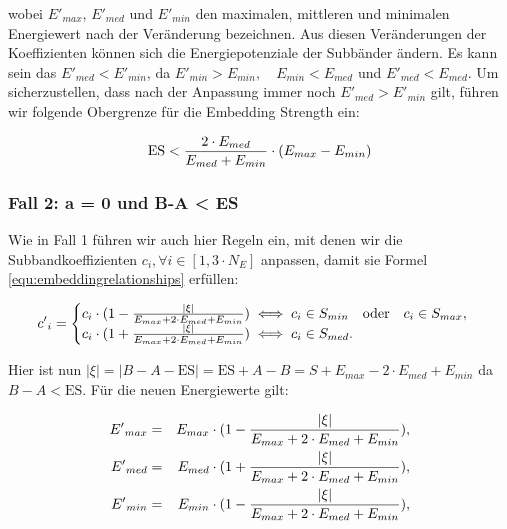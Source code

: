 wobei ${E'}_{max}$, ${E'}_{med}$ und ${E'}_{min}$ den maximalen, mittleren und minimalen Energiewert nach der Veränderung bezeichnen. Aus diesen Veränderungen der Koeffizienten können sich die Energiepotenziale der Subbänder ändern. Es kann sein das ${E'}_{med} < {E'}_{min}$, da ${E'}_{min}>{E}_{min},\quad {E}_{min}<{E}_{med}$ und ${E'}_{med}<{E}_{med}$. Um sicherzustellen, dass nach der Anpassung immer noch ${E'}_{med} > {E'}_{min}$ gilt, führen wir folgende Obergrenze für die Embedding Strength ein:

	\begin{equation}
		\mbox{ES} < { 2 \cdot {E}_{med} \over {E}_{med} + {E}_{min} } \cdot ( {E}_{max} - {E}_{min} )
		\label{equ:embeddingstrengthconstraint_case1}
	\end{equation}

\subsubsection{Fall 2: a = 0 und B-A < ES}

Wie in Fall 1 führen wir auch hier Regeln ein, mit denen wir die Subbandkoeffizienten ${c}_{i}, \forall i \in [1, 3\cdot{N}_{E}]$ anpassen, damit sie Formel \ref{equ:embeddingrelationships} erfüllen:

	 \begin{equation}
		 {c'}_{i} = \begin{cases}
    	 				{c}_{i} \cdot ( 1 - { |\xi| \over {{E}_{max} + 2\cdot {E}_{med} + {E}_{min}} }) \iff {c}_{i} \in {S}_{min} \quad\mbox{oder}\quad {c}_{i} \in {S}_{max}, 
						\\
    					{c}_{i} \cdot ( 1 + { |\xi| \over {{E}_{max} + 2\cdot {E}_{med} + {E}_{min}} }) \iff {c}_{i} \in {S}_{med}.
  				  	\end{cases}
		  \label{equ:modifcoef_case2}
	 \end{equation}
	 
Hier ist nun  $|\xi| = |B-A-\mbox{ES}| = \mbox{ES}+A-B = S + {E}_{max} - 2\cdot {E}_{med} + {E}_{min}$ da $B-A<\mbox{ES}$. Für die neuen Energiewerte gilt:

	 \begin{eqnarray*}
		 {E'}_{max} & = & {E}_{max} \cdot (1 - { |\xi| \over {{E}_{max} + 2\cdot {E}_{med} + {E}_{min}} }),
		 \\ 
		 {E'}_{med} & = & {E}_{med} \cdot (1 + { |\xi| \over {{E}_{max} + 2\cdot {E}_{med} + {E}_{min}} }),
		 \\
		 {E'}_{min} & = & {E}_{min} \cdot (1 - { |\xi| \over {{E}_{max} + 2\cdot {E}_{med} + {E}_{min}} }),
	\end{eqnarray*}
	

